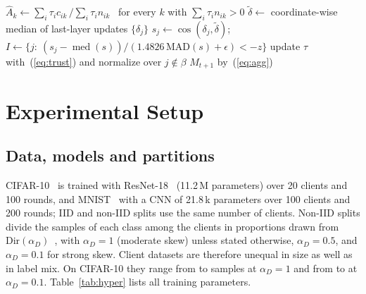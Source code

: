 \documentclass[journal]{IEEEtran}
\begin{document}
\begin{algorithm}[t]
\caption{AntiFLipper: server side of round $t$}
\label{alg:af}
\small
{}
$\hat A_k\leftarrow\sum_i\tau_ic_{ik}\,/\sum_i\tau_in_{ik}$ \ for every $k$ with $\sum_i\tau_in_{ik}>0$\;
$\tilde\delta\leftarrow$ coordinate-wise median of last-layer updates $\{\delta_j\}$\;
$s_j\leftarrow\cos(\delta_j,\tilde\delta)$; \ $I\leftarrow\{j:\ (s_j-\operatorname{med}(s))/(1.4826\,\mathrm{MAD}(s)+\epsilon)<-z\}$\;
update $\tau$ with~(\ref{eq:trust}) and normalize over $j\notin\beta$\;
\Return $M_{t+1}$ by~(\ref{eq:agg})
\end{algorithm}

\section{Experimental Setup}
\label{sec:setup}
\subsection{Data, models and partitions}
CIFAR-10~\cite{CIFAR-krizhevsky2009learning} is trained with ResNet-18~\cite{resnet-he2016deep} (11.2\,M parameters) over 20 clients and 100 rounds, and MNIST~\cite{MNIST-lecun1998gradient} with a CNN of 21.8\,k parameters over 100 clients and 200 rounds; IID and non-IID splits use the same number of clients. Non-IID splits divide the samples of each class among the clients in proportions drawn from $\mathrm{Dir}(\alpha_D)$~\cite{hsu2019measuring}, with $\alpha_D{=}1$ (moderate skew) unless stated otherwise, $\alpha_D{=}0.5$, and $\alpha_D{=}0.1$ for strong skew. Client datasets are therefore unequal in size as well as in label mix. On CIFAR-10 they range from \sizeHighMin{} to \sizeHighMax{} samples at $\alpha_D{=}1$ and from \sizeLowMin{} to \sizeLowMax{} at $\alpha_D{=}0.1$. Table~\ref{tab:hyper} lists all training parameters.
\end{document}

